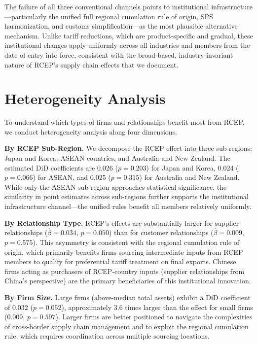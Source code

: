 \documentclass[preprint,12pt,authoryear]{elsarticle}
\begin{document}
The failure of all three conventional channels points to institutional infrastructure---particularly the unified full regional cumulation rule of origin, SPS harmonization, and customs simplification---as the most plausible alternative mechanism. Unlike tariff reductions, which are product-specific and gradual, these institutional changes apply uniformly across all industries and members from the date of entry into force, consistent with the broad-based, industry-invariant nature of RCEP's supply chain effects that we document.

\section{Heterogeneity Analysis}
\label{sec:heterogeneity}



To understand which types of firms and relationships benefit most from RCEP, we conduct heterogeneity analysis along four dimensions.

\textbf{By RCEP Sub-Region.} We decompose the RCEP effect into three sub-regions: Japan and Korea, ASEAN countries, and Australia and New Zealand. The estimated DiD coefficients are 0.026 ($p = 0.203$) for Japan and Korea, 0.024 ($p = 0.066$) for ASEAN, and 0.025 ($p = 0.315$) for Australia and New Zealand. While only the ASEAN sub-region approaches statistical significance, the similarity in point estimates across sub-regions further supports the institutional infrastructure channel---the unified rules benefit all members relatively uniformly.

\textbf{By Relationship Type.} RCEP's effects are substantially larger for supplier relationships ($\hat{\beta} = 0.034$, $p = 0.050$) than for customer relationships ($\hat{\beta} = 0.009$, $p = 0.575$). This asymmetry is consistent with the regional cumulation rule of origin, which primarily benefits firms sourcing intermediate inputs from RCEP members to qualify for preferential tariff treatment on final exports. Chinese firms acting as purchasers of RCEP-country inputs (supplier relationships from China's perspective) are the primary beneficiaries of this institutional innovation.

\textbf{By Firm Size.} Large firms (above-median total assets) exhibit a DiD coefficient of 0.032 ($p = 0.052$), approximately 3.6 times larger than the effect for small firms (0.009, $p = 0.597$). Larger firms are better positioned to navigate the complexities of cross-border supply chain management and to exploit the regional cumulation rule, which requires coordination across multiple sourcing locations.
\end{document}
